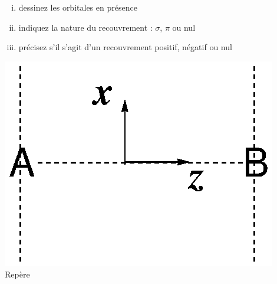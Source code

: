 \begin{minipage}[c]{0.8\linewidth}
\begin{enumerate}[(i)] 
\item dessinez les orbitales en pr\'esence
\item indiquez la nature du recouvrement : $\sigma$, $\pi$ ou nul 
\item  pr\'ecisez s'il s'agit d'un recouvrement positif, n\'egatif ou nul
\end{enumerate} 
\end{minipage}
\begin{minipage}[l]{0.1\linewidth}     
\includegraphics[scale=0.4]{figure/AB_repere.eps}\\   
Rep\`ere
\end{minipage}

\vspace{0.3cm}

